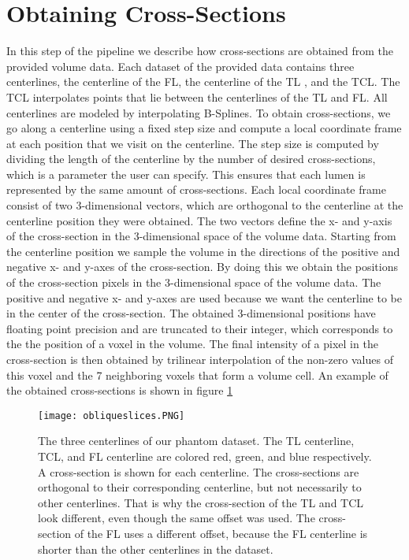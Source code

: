 \documentclass[thesis.tex]{subfiles}
\begin{document}
\section{Obtaining Cross-Sections}
In this step of the pipeline we describe how cross-sections are obtained from the provided volume data. Each dataset of the provided data contains three centerlines, the centerline of the FL, the centerline of the TL , and the TCL. The TCL interpolates points that lie between the centerlines of the TL and FL. All centerlines are modeled by interpolating B-Splines. To obtain cross-sections, we go along a centerline using a fixed step size and compute a local coordinate frame at each position that we visit on the centerline. The step size is computed by dividing the length of the centerline by the number of desired cross-sections, which is a parameter the user can specify. This ensures that each lumen is represented by the same amount of cross-sections. Each local coordinate frame consist of two 3-dimensional vectors, which are orthogonal to the centerline at the centerline position they were obtained. The two vectors define the x- and y-axis of the cross-section in the 3-dimensional space of the volume data. Starting from the centerline position we sample the volume in the directions of the positive and negative x- and y-axes of the cross-section. By doing this we obtain the positions of the cross-section pixels in the 3-dimensional space of the volume data. The positive and negative x- and y-axes are used because we want the centerline to be in the center of the cross-section. The obtained 3-dimensional positions have floating point precision and are truncated to their integer, which corresponds to the the position of a voxel in the volume. The final intensity of a pixel in the cross-section is then obtained by trilinear interpolation of the non-zero values of this voxel and the 7 neighboring voxels that form a volume cell. An example of the obtained cross-sections is shown in figure \ref{fig:obliqueslices}\\

\begin{figure}[h]
\centering
\texttt{[image: obliqueslices.PNG]}
\caption{The three centerlines of our phantom dataset. The TL centerline, TCL, and FL centerline are colored red, green, and blue respectively. A cross-section is shown for each centerline. The cross-sections are orthogonal to their corresponding centerline, but not necessarily to other centerlines. That is why the cross-section of the TL and TCL look different, even though the same offset was used. The cross-section of the FL uses a different offset, because the FL centerline is shorter than the other centerlines in the dataset.}
\label{fig:obliqueslices}
\end{figure} 
\end{document}
